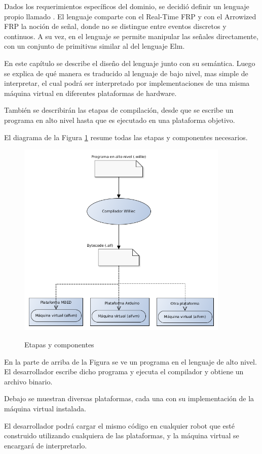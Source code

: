 
  Dados los requerimientos específicos del dominio, se decidió definir un lenguaje
propio llamado \frob{}. El lenguaje comparte con el Real-Time FRP y con el Arrowized FRP la noción
de señal, donde no se distingue entre eventos discretos y continuos.
  A su vez, en el lenguaje se permite manipular las señales directamente, con un
conjunto de primitivas similar al del lenguaje Elm.

  En este capítulo se describe el diseño del lenguaje \frob{} junto con su semántica.
  Luego se explica de qué manera es traducido al lenguaje \alf{} de
bajo nivel, mas simple de interpretar, el cual podrá ser interpretado
por implementaciones de una misma máquina virtual en diferentes
plataformas de hardware.

  También se describirán las etapas de compilación, desde que se escribe
un programa en alto nivel hasta que es ejecutado en una
plataforma objetivo.

  El diagrama de la Figura \ref{fig:compilacion} resume todas las etapas y
componentes necesarios.

\begin{figure}[h]
\begin{center}
\caption{Etapas y componentes}
\includegraphics[width=0.9\textwidth]{graphs/compilacion.png}
\label{fig:compilacion}
\end{center}
\end{figure}

  En la parte de arriba de la Figura se ve un programa en el
lenguaje \frob{} de alto nivel.
  El desarrollador escribe dicho programa y
ejecuta el compilador \compilador{} y obtiene un archivo \alf{} binario.

  Debajo se muestran diversas plataformas, cada una
con su implementación de la máquina virtual \maquinavirtual{} instalada.

  El desarrollador podrá cargar el mismo código \alf{} en cualquier robot que
esté construido utilizando cualquiera de las plataformas, y la máquina
virtual se encargará de interpretarlo.
